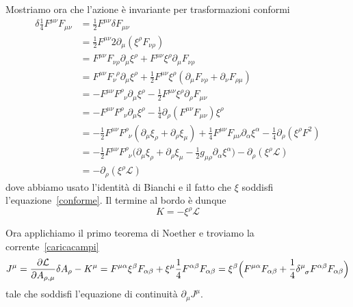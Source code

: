     Mostriamo ora che l'azione è invariante per trasformazioni conformi 
\begin{equation*}
\begin{aligned}
     \delta \frac{1}{4} F^{\mu\nu} F_{\mu\nu} & = \frac{1}{2} F^{\mu\nu} \delta F_{\mu\nu} \\ & = \frac{1}{2} F^{\mu\nu} 2 \partial_\mu (\xi^\rho F_{\nu \rho}) \\ & = F^{\mu\nu} F_{\nu\rho} \partial_\mu \xi^\rho + F^{\mu\nu} \xi^\rho \partial_\mu F_{\nu\rho} \\ & = F^{\mu\nu} F_\nu^{\phantom \nu \rho} \partial_\mu \xi^\rho + \frac{1}{2} F^{\mu\nu} \xi^\rho (\partial_\mu F_{\nu\rho} + \partial_\nu F_{\rho\mu}) \\ & = - F^{\mu\nu} F^\rho_{\phantom \rho \nu} \partial_\mu \xi^\rho - \frac{1}{2} F^{\mu\nu} \xi^\rho \partial_\rho F_{\mu\nu} \\ & = - F^{\mu\nu} F^\rho_{\phantom \rho \nu} \partial_\mu \xi^\rho - \frac{1}{4} \partial_\rho (F^{\mu\nu} F_{\mu\nu}) \xi^\rho \\ & = - \frac{1}{2} F^{\mu\nu} F^\rho_{\phantom \rho \nu} (\partial_\mu \xi_\rho + \partial_\rho \xi_\mu) + \frac{1}{4} F^{\mu\nu} F_{\mu\nu} \partial_\alpha \xi^\alpha - \frac{1}{4} \partial_\rho (\xi^\rho F^2) \\ & = - \frac{1}{2} F^{\mu\nu} F^\rho_{\phantom \rho \nu} \Big ( \partial_\mu \xi_\rho + \partial_\rho \xi_\mu - \frac{1}{2} g_{\mu\rho} \partial_\alpha \xi^\alpha \Big) - \partial_\rho(\xi^\rho \mathcal L) \\ & = - \partial_\rho(\xi^\rho \mathcal L)
\end{aligned}
\end{equation*}
    dove abbiamo usato l'identità di Bianchi e il fatto che $\xi$ soddisfi l'equazione~\eqref{conforme}. Il termine al bordo è dunque 
\begin{equation*}
    K = - \xi^\rho \mathcal L
\end{equation*}

    Ora applichiamo il primo teorema di Noether e troviamo la corrente~\eqref{caricacampi} 
\begin{equation*}
    J^\mu = \pdv{\mathcal L}{A_{\rho,\mu}} \delta A_\rho - K^\mu = F^{\mu\alpha} \xi^\beta F_{\alpha\beta} +  \xi^\mu \frac{1}{4} F^{\alpha\beta} F_{\alpha\beta} = \xi^\beta \Big ( F^{\mu \alpha} F_{\alpha \beta} + \frac{1}{4} \delta^\mu_{\phantom \mu \sigma} F^{\alpha \beta} F_{\alpha \beta} \Big)
\end{equation*}
    tale che soddisfi l'equazione di continuità $\partial_\mu J^\mu$. 

